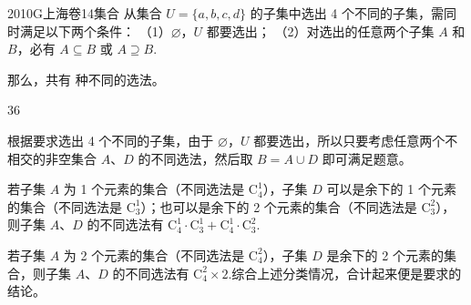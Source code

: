 
\begin{problem}{2010}{G}{上海卷}{14}{集合}
从集合 $ U=\{a,b,c,d\} $ 的子集中选出 4 个不同的子集，需同时满足以下两个条件：  
（1）$ \varnothing $，$ U $ 都要选出；  
（2）对选出的任意两个子集 $ A $ 和 $ B $，必有 $ A\subseteq B $ 或 $ A\supseteq B $.  

那么，共有 \underline{\hspace{4em}} 种不同的选法。
\end{problem}

\begin{answer}
36
\end{answer}

\begin{solutions}
根据要求选出 4 个不同的子集，由于 $ \varnothing $，$ U $ 都要选出，所以只要考虑任意两个不相交的非空集合 $ A $、$ D $ 的不同选法，然后取 $ B=A\cup D $ 即可满足题意。  

若子集 $ A $ 为 1 个元素的集合（不同选法是 $ \mathrm{C}_4^1 $），子集 $ D $ 可以是余下的 1 个元素的集合（不同选法是 $ \mathrm{C}_3^1 $）；也可以是余下的 2 个元素的集合（不同选法是 $ \mathrm{C}_3^2 $），则子集 $ A $、$ D $ 的不同选法有 $ \mathrm{C}_4^1\cdot \mathrm{C}_3^1+\mathrm{C}_4^1\cdot \mathrm{C}_3^2 $.  

若子集 $ A $ 为 2 个元素的集合（不同选法是 $ \mathrm{C}_4^2 $），子集 $ D $ 是余下的 2 个元素的集合，则子集 $ A $、$ D $ 的不同选法有 $ \mathrm{C}_4^2\times 2 $.综合上述分类情况，合计起来便是要求的结论。
\end{solutions}